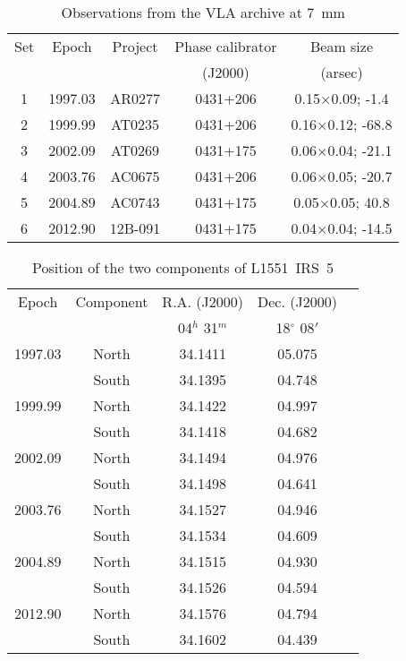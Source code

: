 \documentclass[debug]{rmaa}
\begin{document}
\begin{table}[!ht]\centering
  \setlength{\tabnotewidth}{1.0\columnwidth}
  \caption{Observations from the VLA archive at 7~mm} 
  \label{Table1}
  \scriptsize
\begin{tabular}{ccccc}\toprule
Set &  Epoch    &    Project   &   Phase calibrator   &   Beam size        \\
    &           &          & (J2000)    &   (arsec)                \\ \midrule
1   &  1997.03  &  AR0277  &  0431+206  &   0.15$\times$0.09; -1.4      \\
2   &  1999.99  &  AT0235  &  0431+206  &   0.16$\times$0.12; -68.8      \\
3   &  2002.09  &  AT0269  &  0431+175  &   0.06$\times$0.04; -21.1      \\
4   &  2003.76  &  AC0675  &  0431+206  &   0.06$\times$0.05; -20.7      \\
5   &  2004.89  &  AC0743  &  0431+175  &   0.05$\times$0.05; 40.8      \\
6   &  2012.90  &  12B-091 &  0431+175  &   0.04$\times$0.04; -14.5      \\   \bottomrule

\end{tabular}
\end{table}



\begin{table}[!t]\centering
  \setlength{\tabnotewidth}{1.0\columnwidth}
  \caption{Position of the two components of L1551~IRS~5} 
  \label{Table2}
  \scriptsize
\begin{tabular}{ccccc}\toprule
Epoch   &   Component  &  R.A. (J2000)   &   Dec. (J2000)  &   \\  
        &              & 04$^{h}$ 31$^{m}$ & 18$^{\circ}$ 08$'$  &  \\  \midrule

1997.03  &  North  &  34.1411  &  05.075  &         \\
         &  South  &  34.1395  &  04.748  &         \\
1999.99  &  North  &  34.1422  &  04.997  &         \\
         &  South  &  34.1418  &  04.682  &         \\
2002.09  &  North  &  34.1494  &  04.976  &         \\
         &  South  &  34.1498  &  04.641  &         \\
2003.76  &  North  &  34.1527  &  04.946  &         \\
         &  South  &  34.1534  &  04.609  &         \\
2004.89  &  North  &  34.1515  &  04.930  &         \\
         &  South  &  34.1526  &  04.594  &         \\
2012.90  &  North  &  34.1576  &  04.794  &         \\
         &  South  &  34.1602  &  04.439  &         \\
         \bottomrule
\end{tabular}
\end{table}
\end{document}
